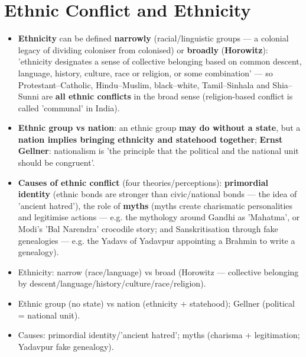 \section{Ethnic Conflict and Ethnicity}

\begin{KeyConcept}
\begin{itemize}
\item \textbf{Ethnicity} can be defined \textbf{narrowly} (racial/linguistic groups --- a colonial legacy of dividing coloniser from colonised) or \textbf{broadly} (\textbf{Horowitz}): 'ethnicity designates a sense of collective belonging based on common descent, language, history, culture, race or religion, or some combination' --- so Protestant--Catholic, Hindu--Muslim, black--white, Tamil--Sinhala and Shia--Sunni are \textbf{all ethnic conflicts} in the broad sense (religion-based conflict is called 'communal' in India).
\item \textbf{Ethnic group vs nation}: an ethnic group \textbf{may do without a state}, but a \textbf{nation implies bringing ethnicity and statehood together}; \textbf{Ernst Gellner}: nationalism is 'the principle that the political and the national unit should be congruent'.
\item \textbf{Causes of ethnic conflict} (four theories/perceptions): \textbf{primordial identity} (ethnic bonds are stronger than civic/national bonds --- the idea of 'ancient hatred'), the role of \textbf{myths} (myths create charismatic personalities and legitimise actions --- e.g. the mythology around Gandhi as 'Mahatma', or Modi's 'Bal Narendra' crocodile story; and Sanskritisation through fake genealogies --- e.g. the Yadavs of Yadavpur appointing a Brahmin to write a genealogy).
\end{itemize}
\end{KeyConcept}

\begin{QuickRevision}
\begin{itemize}
\item Ethnicity: narrow (race/language) vs broad (Horowitz --- collective belonging by descent/language/history/culture/race/religion).
\item Ethnic group (no state) vs nation (ethnicity + statehood); Gellner (political = national unit).
\item Causes: primordial identity/'ancient hatred'; myths (charisma + legitimation; Yadavpur fake genealogy).
\end{itemize}
\end{QuickRevision}
